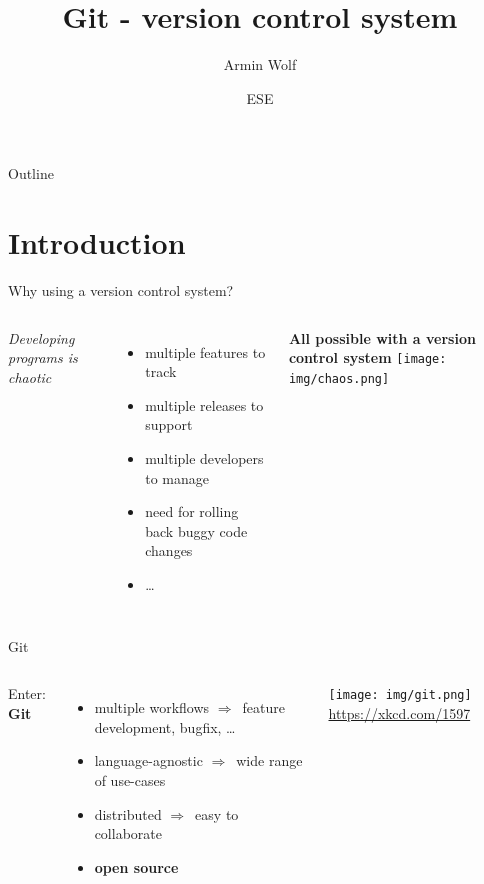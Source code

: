 \documentclass[10pt, graphics, aspectratio=169, table]{beamer}
\title{Git - version control system}
\author{Armin Wolf}
\date{ESE \the\year{}}
\institute{Nerd::101 - ESE - IFSR - TU Dresden}
\newcommand{\ra}{$\Rightarrow$\ }
\begin{document}
    \maketitle

    \begin{frame}{Outline}
        \tableofcontents
    \end{frame}


    \section{Introduction}
    \begin{frame}{Why using a version control system?}
        \begin{columns}
                \emph{Developing programs is chaotic}
                \begin{itemize}
                    \item multiple features to track
                    \item multiple releases to support
                    \item multiple developers to manage
                    \item need for rolling back buggy code changes
                    \item \ldots
                \end{itemize}
                \textbf{All possible with a version control system}
                \texttt{[image: img/chaos.png]}
        \end{columns}
    \end{frame}

    \begin{frame}{Git}
        \begin{columns}
                Enter: \textbf{Git}
                \begin{itemize}
                    \item multiple workflows \ra feature development, bugfix, \ldots
                    \item language-agnostic \ra wide range of use-cases
                    \item distributed \ra easy to collaborate
                    \item \textbf{open source}
                \end{itemize}
                \center\texttt{[image: img/git.png]}
                \center\tiny\url{https://xkcd.com/1597}
        \end{columns}
    \end{frame}
\end{document}
